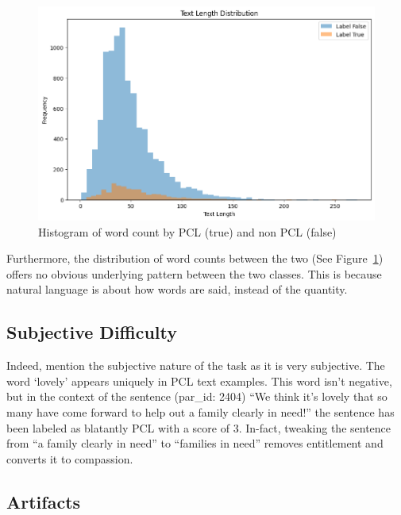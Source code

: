 \documentclass[11pt,a4paper]{article}
\begin{document}
\begin{figure}[H]
    \centering
    \includegraphics[trim=0cm 0cm 0cm .8cm, clip, width=\linewidth]{figures/text-input-length-by-binary-patronizing.png}
    \caption{Histogram of word count by PCL (true) and non PCL (false)\footnotemark}
    \label{fig:word-count}
\end{figure}


Furthermore, the distribution of word counts between the two (See Figure~\ref{fig:word-count}) offers no obvious underlying pattern between the two classes. This is because natural language is about how words are said, instead of the quantity. 

\subsection{Subjective Difficulty}

Indeed, \citet{perez-almendros-etal-2020-dont} mention the subjective nature of the task as it is very subjective. The word `lovely' appears uniquely in PCL text examples. This word isn't negative, but in the context of the sentence (par\_id: 2404) ``We think it's lovely that so many have come forward to help out a family clearly in need!'' the sentence has been labeled as blatantly PCL with a score of 3. In-fact, tweaking the sentence from ``a family clearly in need'' to ``families in need'' removes entitlement and converts it to compassion.

\subsection{Artifacts}\label{sect:artifacts}
\end{document}
